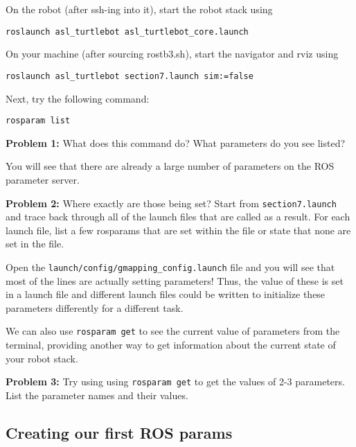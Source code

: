 \documentclass{article}
\begin{document}
On the robot (after ssh-ing into it), start the robot stack using 
\begin{lstlisting}
roslaunch asl_turtlebot asl_turtlebot_core.launch
\end{lstlisting}

On your machine (after sourcing rostb3.sh), start the navigator and rviz using
\begin{lstlisting}
roslaunch asl_turtlebot section7.launch sim:=false
\end{lstlisting}

Next, try the following command:
\begin{lstlisting}
rosparam list
\end{lstlisting}
\textbf{Problem 1:} What does this command do? What parameters do you see listed?

You will see that there are already a large number of parameters on the ROS parameter server. 

\textbf{Problem 2: } Where exactly are those being set? Start from \texttt{section7.launch} and trace back through all of the launch files that are called as a result. For each launch file, list a few rosparams that are set within the file or state that none are set in the file.

Open the \texttt{launch/config/gmapping\_config.launch} file and you will see that most of the lines are actually setting parameters! Thus, the value of these is set in a launch file and different launch files could be written to initialize these parameters differently for a different task.

We can also use \texttt{rosparam get} to see the current value of parameters from the terminal, providing another way to get information about the current state of your robot stack. 

\textbf{Problem 3: } Try using using \texttt{rosparam get} to get the values of 2-3 parameters. List the parameter names and their values.

\subsection{Creating our first ROS params}
\end{document}
